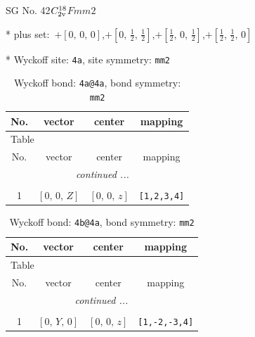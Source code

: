 \documentclass[fleqn,8pt]{jsarticle}
\begin{document}
\setcounter{MaxMatrixCols}{32}

\renewcommand{\tablename}{Table~}
\renewcommand{\figurename}{Figure~}
\begin{center}
\LARGE
SG No. 42\quad$C_{\rm 2v}^{18}$\quad$Fmm2$\quad[ orthorhombic ]
\end{center}

* plus set:\,\,\,$+\left[ 0,\, 0,\, 0 \right]$,\quad $+\left[ 0,\, \frac{1}{2},\, \frac{1}{2} \right]$,\quad $+\left[ \frac{1}{2},\, 0,\, \frac{1}{2} \right]$,\quad $+\left[ \frac{1}{2},\, \frac{1}{2},\, 0 \right]$


* Wyckoff site: {\tt 4a}, site symmetry: {\tt mm2}
\renewcommand{\arraystretch}{1.2}
\begin{longtable}{cccc}
\caption{Wyckoff bond: {\tt 4a@4a}, bond symmetry: {\tt mm2}}
 \\
 \hline \hline
No. & vector & center & mapping \\ \hline \endfirsthead

\multicolumn{3}{l}{\tablename\ \thetable{}} \\
 \hline \hline
No. & vector & center & mapping \\ \hline \endhead

 \hline \hline
\multicolumn{3}{r}{\footnotesize\it continued ...} \\ \endfoot

 \hline \hline
\multicolumn{3}{r}{} \\ \endlastfoot

1 & $\left[ 0,\, 0,\, Z \right]$ & $\left[ 0,\, 0,\, z \right]$ & {\tt [1,2,3,4]} \\
\end{longtable}
\renewcommand{\arraystretch}{1.2}
\begin{longtable}{cccc}
\caption{Wyckoff bond: {\tt 4b@4a}, bond symmetry: {\tt mm2}}
 \\
 \hline \hline
No. & vector & center & mapping \\ \hline \endfirsthead

\multicolumn{3}{l}{\tablename\ \thetable{}} \\
 \hline \hline
No. & vector & center & mapping \\ \hline \endhead

 \hline \hline
\multicolumn{3}{r}{\footnotesize\it continued ...} \\ \endfoot

 \hline \hline
\multicolumn{3}{r}{} \\ \endlastfoot

1 & $\left[ 0,\, Y,\, 0 \right]$ & $\left[ 0,\, 0,\, z \right]$ & {\tt [1,-2,-3,4]} \\
\end{longtable}
\end{document}
